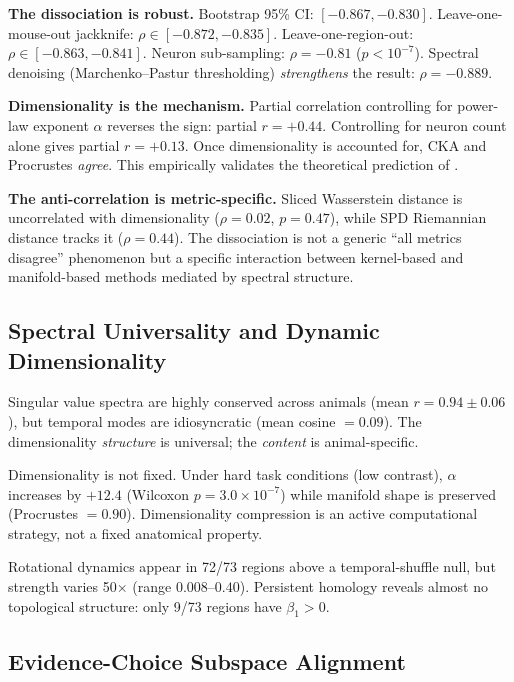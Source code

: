\documentclass{article}
\begin{document}
\textbf{The dissociation is robust.} Bootstrap 95\% CI: $[-0.867, -0.830]$. Leave-one-mouse-out jackknife: $\rho \in [-0.872, -0.835]$. Leave-one-region-out: $\rho \in [-0.863, -0.841]$. Neuron sub-sampling: $\rho = -0.81$ ($p < 10^{-7}$). Spectral denoising (Marchenko--Pastur thresholding) \emph{strengthens} the result: $\rho = -0.889$.

\textbf{Dimensionality is the mechanism.} Partial correlation controlling for power-law exponent $\alpha$ reverses the sign: partial $r = +0.44$. Controlling for neuron count alone gives partial $r = +0.13$. Once dimensionality is accounted for, CKA and Procrustes \emph{agree}. This empirically validates the theoretical prediction of \citet{harvey2024representational}.

\textbf{The anti-correlation is metric-specific.} Sliced Wasserstein distance is uncorrelated with dimensionality ($\rho = 0.02$, $p = 0.47$), while SPD Riemannian distance tracks it ($\rho = 0.44$). The dissociation is not a generic ``all metrics disagree'' phenomenon but a specific interaction between kernel-based and manifold-based methods mediated by spectral structure.

\subsection{Spectral Universality and Dynamic Dimensionality}

Singular value spectra are highly conserved across animals (mean $r = 0.94 \pm 0.06$), but temporal modes are idiosyncratic (mean cosine $= 0.09$). The dimensionality \emph{structure} is universal; the \emph{content} is animal-specific.

Dimensionality is not fixed. Under hard task conditions (low contrast), $\alpha$ increases by $+12.4$ (Wilcoxon $p = 3.0 \times 10^{-7}$) while manifold shape is preserved (Procrustes $= 0.90$). Dimensionality compression is an active computational strategy, not a fixed anatomical property.

Rotational dynamics appear in 72/73 regions above a temporal-shuffle null, but strength varies 50$\times$ (range $0.008$--$0.40$). Persistent homology reveals almost no topological structure: only 9/73 regions have $\beta_1 > 0$.

\subsection{Evidence-Choice Subspace Alignment}
\end{document}

